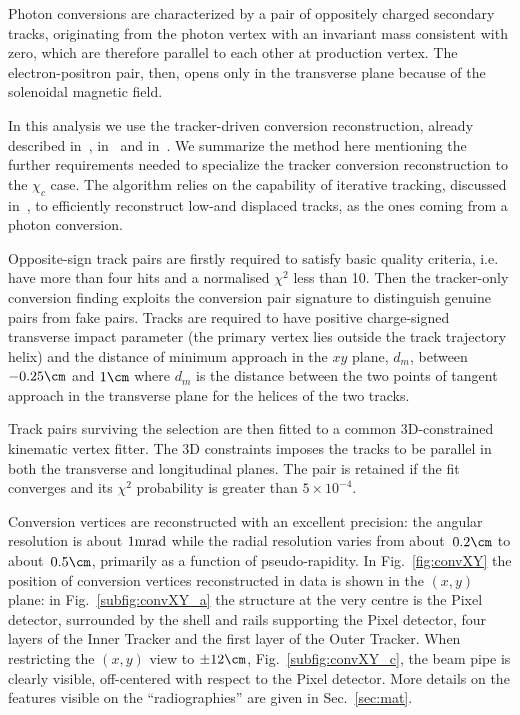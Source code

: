 Photon conversions are characterized by a pair of
oppositely charged secondary tracks, originating from the photon vertex with an
invariant mass consistent with zero,  which are therefore parallel
to each other at production vertex. The electron-positron pair, then,
opens only in the transverse plane because of the solenoidal magnetic field.



In this analysis we use the tracker-driven conversion reconstruction,
already described in~\cite{TRK-10-001}, in~\cite{trk10001} and in~\cite{TRK-10-003}. We
summarize the method here mentioning the further requirements needed to  
specialize the tracker conversion reconstruction to the $\chi_c$
case. The algorithm relies on the capability of iterative tracking,
discussed in~\cite{TRK-10-001}, to efficiently reconstruct low-\pt and
displaced tracks, as the ones coming from a photon conversion.

Opposite-sign track pairs are firstly required to satisfy basic
quality criteria, i.e. have more than four hits and a normalised
$\chi^2$ less than 10. Then
the tracker-only conversion finding exploits the conversion pair
signature to distinguish genuine pairs from fake pairs.
Tracks are required to have positive charge-signed transverse impact
parameter (the primary vertex lies outside the track trajectory helix)
and the distance of minimum approach in the $xy$ plane, $d_m$, between $-0.25\cm$
and $1\cm$ where $d_m$ is
the distance between the two points of tangent approach in the
transverse plane for the helices of the two tracks.




Track pairs surviving the selection are then fitted to a common
3D-constrained kinematic vertex fitter. The 3D constraints imposes the
tracks to be parallel in both the transverse and longitudinal planes.
The pair is retained if the fit converges and its $\chi^2$ probability
is greater than $5\times10^{-4}$.



Conversion vertices are reconstructed with an excellent precision:
the angular resolution is about $1{\rm mrad}$ while the radial resolution varies from about~$0.2\cm$ to about~$0.5\cm$, primarily
as a function of pseudo-rapidity.
In Fig.~\ref{fig:convXY} the position of conversion vertices reconstructed in data is shown in the $(x,y)$ plane:
in Fig.~\ref{subfig:convXY_a} the structure at the very centre is the Pixel detector,
surrounded by the shell and rails supporting the Pixel detector, four layers of the Inner Tracker and the first layer of the Outer Tracker.
When restricting the $(x,y)$ view to $\pm 12\cm$, Fig.~\ref{subfig:convXY_c}, the beam pipe is clearly visible, off-centered with respect to
the Pixel detector. More details on the features visible on the ``radiographies'' are given in Sec.~\ref{sec:mat}.

